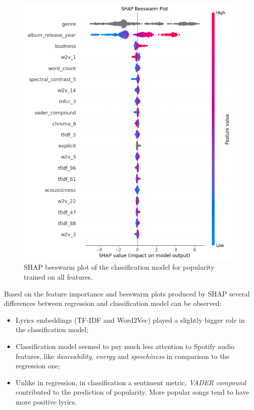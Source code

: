 \begin{center}
\begin{figure}[H]
  \centering
  \includegraphics[width=5in]{img/beeswarm_popularity_clf.png}
  \caption{SHAP beeswarm plot of the classification model for popularity trained on all features.}
  \label{Figure:fig_beh}
\end{figure}
\end{center}


Based on the feature importance and beeswarm plots produced by SHAP 
several differences between regression and classification model can
be observed:
\begin{itemize}
  \item Lyrics embeddings (TF-IDF and Word2Vec) played a slightly bigger role in
    the classification model;
  \item Classification model seemed to pay much less attention to Spotify audio
    features, like \textit{danceability}, \textit{energy} and
    \textit{speechiness} in comparison to the regression one;
  \item Unlike in regression, in classification a sentiment metric,
    \textit{VADER compound} contributed to the prediction of popularity. More
    popular songs tend to have more positive lyrics.
\end{itemize}


